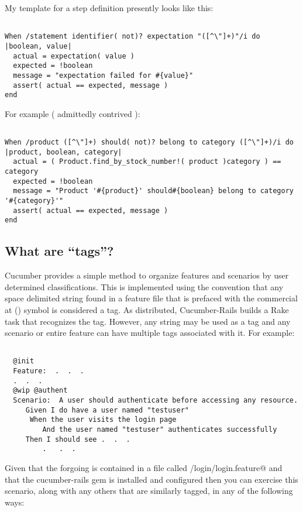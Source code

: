 \documentclass[10pt]{book}
\begin{document}
My template for a step definition presently looks like this:
\begin{verbatim}

When /statement identifier( not)? expectation "([^\"]+)"/i do |boolean, value|
  actual = expectation( value )
  expected = !boolean
  message = "expectation failed for #{value}" 
  assert( actual == expected, message )
end

\end{verbatim}

For example ( admittedly contrived ):
\begin{verbatim}

When /product ([^\"]+) should( not)? belong to category ([^\"]+)/i do |product, boolean, category|
  actual = ( Product.find_by_stock_number!( product )category ) == category 
  expected = !boolean
  message = "Product '#{product}' should#{boolean} belong to category '#{category}'"
  assert( actual == expected, message )
end

\end{verbatim}

\subsection{What are ``tags''?}

Cucumber provides a simple method to organize features and scenarios by user determined classifications.  This is implemented using the convention that any space delimited string found in a feature file that is prefaced with the commercial at (\textbf{\verb@@@}) symbol is considered a tag.  As distributed, Cucumber-Rails builds a Rake task that recognizes the \emph{\verb@@wip@} tag.  However, any string may be used as a tag and any scenario or entire feature can have multiple tags associated with it.  For example:

\begin{verbatim}

  @init
  Feature:  .  .  .
  .  .  .
  @wip @authent
  Scenario:  A user should authenticate before accessing any resource.
     Given I do have a user named "testuser"
      When the user visits the login page
         And the user named "testuser" authenticates successfully
     Then I should see .  .  .
         .   .  .

\end{verbatim}

Given that the forgoing is contained in a file called \verb@features/login/login.feature@ and that the cucumber-rails gem is installed and configured then you can exercise this scenario, along with any others that are similarly tagged, in any of the following ways:
\end{document}
